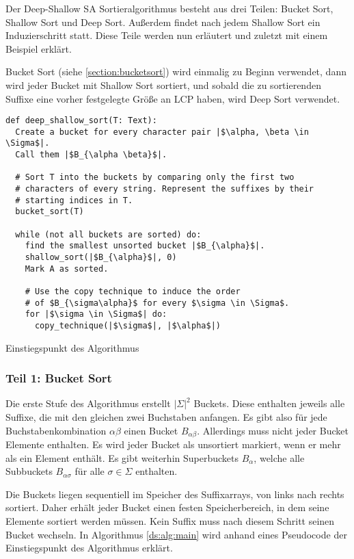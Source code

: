Der Deep-Shallow SA Sortieralgorithmus besteht aus drei Teilen: Bucket Sort, Shallow Sort und Deep Sort.
Außerdem findet nach jedem Shallow Sort ein Induzierschritt statt.
Diese Teile werden nun erläutert und zuletzt mit einem Beispiel erklärt.

Bucket Sort (siehe \cref{section:bucketsort}) wird einmalig zu Beginn verwendet, dann wird jeder Bucket mit Shallow Sort sortiert, und sobald die zu sortierenden Suffixe eine vorher festgelegte Größe an LCP haben, wird Deep Sort verwendet.

\begin{listing}
\begin{verbatim}
def deep_shallow_sort(T: Text):
  Create a bucket for every character pair |$\alpha, \beta \in \Sigma$|.
  Call them |$B_{\alpha \beta}$|.

  # Sort T into the buckets by comparing only the first two
  # characters of every string. Represent the suffixes by their
  # starting indices in T.
  bucket_sort(T)

  while (not all buckets are sorted) do:
    find the smallest unsorted bucket |$B_{\alpha}$|.
    shallow_sort(|$B_{\alpha}$|, 0)
    Mark A as sorted.

    # Use the copy technique to induce the order
    # of $B_{\sigma\alpha}$ for every $\sigma \in \Sigma$.
    for |$\sigma \in \Sigma$| do:
      copy_technique(|$\sigma$|, |$\alpha$|)
\end{verbatim}
\caption{Einstiegspunkt des Algorithmus}
\label{ds:alg:main}
\end{listing}

\subsubsection{Teil 1: Bucket Sort}

Die erste Stufe des Algorithmus erstellt $|\Sigma|^2$ Buckets.
Diese enthalten jeweils alle Suffixe, die mit den gleichen zwei Buchstaben anfangen.
Es gibt also für jede Buchstabenkombination $\alpha\beta$ einen Bucket $B_{\alpha\beta}$.
Allerdings muss nicht jeder Bucket Elemente enthalten.
Es wird jeder Bucket als unsortiert markiert, wenn er mehr als ein Element enthält.
Es gibt weiterhin Superbuckets $B_\alpha$, welche alle Subbuckets $B_{\alpha\sigma}$ für alle $\sigma \in \Sigma$ enthalten.

Die Buckets liegen sequentiell im Speicher des Suffixarrays, von links nach rechts sortiert.
Daher erhält jeder Bucket einen festen Speicherbereich, in dem seine Elemente sortiert werden müssen.
Kein Suffix muss nach diesem Schritt seinen Bucket wechseln.
In Algorithmus \ref{ds:alg:main} wird anhand eines Pseudocode der Einstiegspunkt des Algorithmus erklärt.


